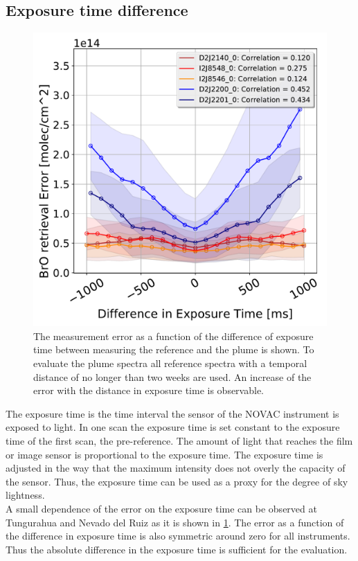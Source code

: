 \subsection{Exposure time difference}
\begin{figure}
    \centering
    \includegraphics[width=0.7\linewidth]{Bilder/DiffExpTimeallInstruments}
    \caption[The   measurement error as a function of the difference of exposure time between recording the reference and the plume.]{The   measurement error as a function of the difference of exposure time between measuring the reference and the plume is shown. To evaluate the plume spectra all reference spectra with a temporal distance of no longer than two weeks are used. An increase of the  error with the distance in exposure time is observable.}
    \label{fig:diffexptime}
\end{figure}
The exposure time is the time interval the sensor of the NOVAC instrument is exposed to light. In one scan the exposure time is set constant to the exposure time of the first scan, the pre-reference. The amount of light that reaches the film or image sensor is proportional to the exposure time. The exposure time is adjusted in the way that the maximum intensity does not overly the capacity of the sensor. Thus, the exposure time can be used as a proxy for the degree of sky lightness.\\
A small dependence of the  error on the exposure time can be observed at Tungurahua and Nevado del Ruiz as it is shown in \cref{fig:diffexptime}. The   error as a function of the difference in exposure time is also symmetric around zero for all instruments. Thus the absolute difference in the exposure time is sufficient for the evaluation.\\
